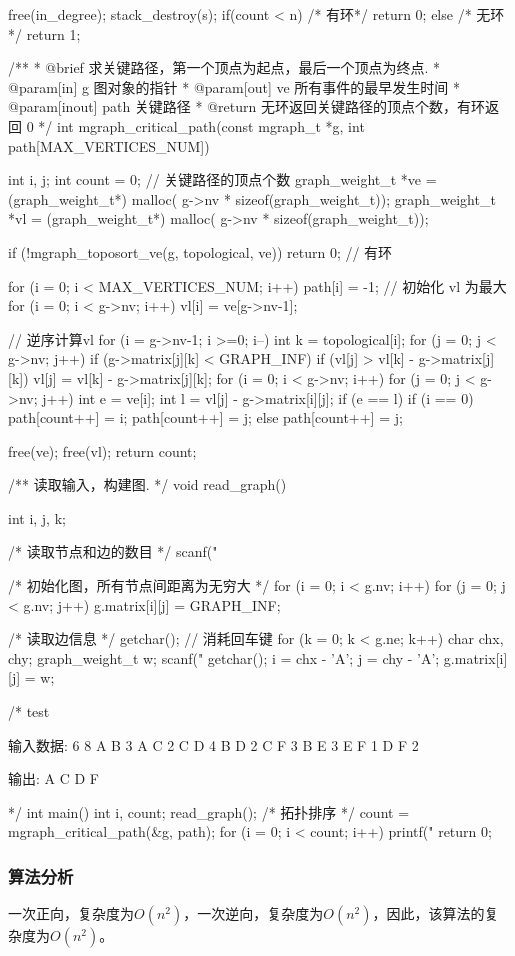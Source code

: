 \begin{Codex}[label=mgraph_critical_path.c]
{    free(in_degree);
    stack_destroy(s);
    if(count < n) { /* 有环*/
        return 0;
    } else { /* 无环*/
        return 1;
    }
}

/**
  * @brief 求关键路径，第一个顶点为起点，最后一个顶点为终点.
  * @param[in] g 图对象的指针
  * @param[out] ve 所有事件的最早发生时间
  * @param[inout] path 关键路径
  * @return 无环返回关键路径的顶点个数，有环返回 0
  */
int mgraph_critical_path(const mgraph_t *g, int path[MAX_VERTICES_NUM]) {
    int i, j;
    int count = 0;    // 关键路径的顶点个数
    graph_weight_t *ve = (graph_weight_t*) malloc(
            g->nv * sizeof(graph_weight_t));
    graph_weight_t *vl = (graph_weight_t*) malloc(
            g->nv * sizeof(graph_weight_t));

    if (!mgraph_toposort_ve(g, topological, ve)) return 0;  // 有环

    for (i = 0; i < MAX_VERTICES_NUM; i++) path[i] = -1;
    // 初始化 vl 为最大
    for (i = 0; i < g->nv; i++) vl[i] = ve[g->nv-1];

    // 逆序计算vl
    for (i = g->nv-1; i >=0; i--) {
        int k = topological[i];
        for (j = 0; j < g->nv; j++) {
            if (g->matrix[j][k] < GRAPH_INF) {
                if (vl[j] > vl[k] - g->matrix[j][k])
                    vl[j] = vl[k] - g->matrix[j][k];
            }
        }
    }
    for (i = 0; i < g->nv; i++) {
        for (j = 0; j < g->nv; j++) {
            int e = ve[i];
            int l = vl[j] - g->matrix[i][j];
            if (e == l) {
                if (i == 0) {
                    path[count++] = i;
                    path[count++] = j;
                } else {
                    path[count++] = j;
                }
            }
        }
    }

    free(ve);
    free(vl);
    return count;
}

/** 读取输入，构建图. */
void read_graph() {
    int i, j, k;

    /* 读取节点和边的数目 */
    scanf("%

    /* 初始化图，所有节点间距离为无穷大 */
    for (i = 0; i < g.nv; i++) {
        for (j = 0; j < g.nv; j++) {
            g.matrix[i][j] = GRAPH_INF;
        }
    }

    /* 读取边信息 */
    getchar(); // 消耗回车键
    for (k = 0; k < g.ne; k++) {
        char chx, chy;
        graph_weight_t w;
        scanf("%
        getchar();
        i = chx - 'A';
        j = chy - 'A';
        g.matrix[i][j] = w;
    }
}

/* test

输入数据:
6 8
A B 3
A C 2
C D 4
B D 2
C F 3
B E 3
E F 1
D F 2

输出: A C D F

*/
int main() {
    int i, count;
    read_graph();
    /* 拓扑排序 */
    count = mgraph_critical_path(&g, path);
    for (i = 0; i < count; i++) {
        printf("%
    }
    return 0;
}
\end{Codex}

\subsubsection{算法分析}
一次正向，复杂度为$O(n^2)$，一次逆向，复杂度为$O(n^2)$，因此，该算法的复杂度为$O(n^2)$。
